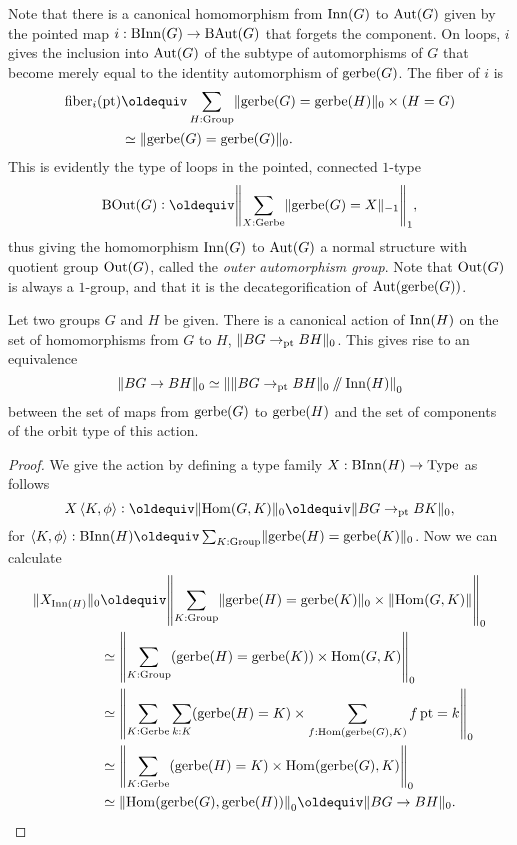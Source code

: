 Note that there is a canonical homomorphism from $\Inn(G)$ to $\Aut(G)$
given by the pointed map $i : \B\Inn(G) \to \B\Aut(G)$ that forgets the component.
On loops, $i$ gives the inclusion into $\Aut(G)$ of the subtype of automorphisms of $G$
that become merely equal to the identity automorphism of $\gerbe(G)$.
The fiber of $i$ is
\begin{align*}
  \fiber_i(\pt)
  &\jdeq \sum_{H : \Group} \Trunc{\gerbe(G) = \gerbe(H)}_0 \times (H = G) \\
  &\equiv \Trunc{\gerbe(G) = \gerbe(G)}_0.
\end{align*}
This is evidently the type of loops in the pointed, connected $1$-type
\[
  \B\Out(G) \defeq \Trunc*{\sum_{X : \Gerbe}\merely{\gerbe(G) = X}}_1,
\]
thus giving the homomorphism $\Inn(G)$ to $\Aut(G)$ a normal structure with
quotient group $\Out(G)$, called the \emph{outer automorphism group}.
Note that $\Out(G)$ is always a $1$-group,
and that it is the decategorification of $\Aut(\gerbe(G))$.

\begin{theorem}
  Let two groups $G$ and $H$ be given.
  There is a canonical action of $\Inn(H)$
  on the set of homomorphisms from $G$ to $H$, $\Trunc{BG \to_\pt BH}_0$.
  This gives rise to an equivalence
  \[
    \Trunc{BG \to BH}_0 \equiv \Trunc*{\Trunc{BG \to_\pt BH}_0 \dblslash \Inn(H)}_0
  \]
  between the set of maps from $\gerbe(G)$ to $\gerbe(H)$ and the set of
  components of the orbit type of this action.
\end{theorem}
\begin{proof}
  We give the action by defining a type family $X : \B\Inn(H) \to \Type$ as follows
  \[
    X\, \angled{K,\phi} \defeq \Trunc{\Hom(G,K)}_0 \jdeq \Trunc{BG \to_\pt BK}_0,
  \]
  for $\angled{K,\phi} : \B\Inn(H) \jdeq \sum_{K : \Group} \Trunc{\gerbe(H) = \gerbe(K)}_0$.
  Now we can calculate
  \begin{align*}
    \Trunc{X_{\Inn(H)}}_0
    &\jdeq \Trunc*{\sum_{K:\Group}\Trunc{\gerbe(H)=\gerbe(K)}_0\times\Trunc{\Hom(G,K)}}_0 \\
    &\equiv \Trunc*{\sum_{K:\Group}(\gerbe(H)=\gerbe(K))\times\Hom(G,K)}_0 \\
    &\equiv \Trunc*{\sum_{K:\Gerbe}\sum_{k:K}(\gerbe(H)=K)\times\sum_{f:\Hom(\gerbe(G),K)}\mathop f \pt = k}_0 \\
    &\equiv \Trunc*{\sum_{K:\Gerbe} (\gerbe(H)=K) \times\Hom(\gerbe(G),K)}_0 \\
    &\equiv \Trunc*{\Hom(\gerbe(G),\gerbe(H))}_0 \jdeq \Trunc{BG \to BH}_0.\qedhere
  \end{align*}
\end{proof}

